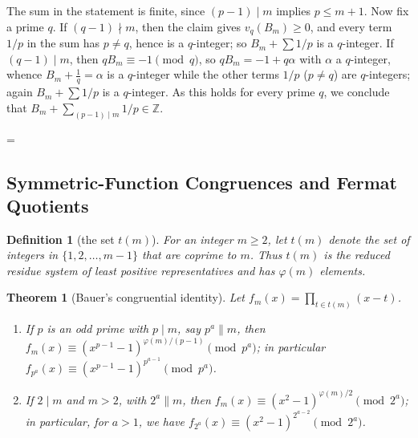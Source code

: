 \documentclass[11pt]{article}
\makeatletter
\theoremstyle{ntstyle}
\newtheorem{theorem}{Theorem}[subsection]
\newtheorem{definition}{Definition}[subsection]
\let\nt@closedisplay\]
\def\nt@guardedclose{\@ifnextchar\par{\nt@closeafterpar}{\@ifnextchar\end{\postdisplaypenalty\@M\nt@closedisplay}{\nt@closedisplay}}}
\def\nt@closeafterpar\par{\@ifnextchar\par{\nt@closeafterpar}{\@ifnextchar\end{\postdisplaypenalty\@M\nt@closedisplay\par}{\nt@closedisplay\par}}}
\renewenvironment{proof}[1][\proofname]{\par
  \pushQED{\qed}\normalfont\topsep\medskipamount\edef\nt@afterproof{\@endparpenalty=\the\@endparpenalty\relax}\@beginparpenalty\@M\@endparpenalty\@M\let\]\nt@guardedclose\trivlist\item[]\textit{#1\@addpunct{.}} \ignorespaces}{\ifvmode\addpenalty\@M\fi\popQED\nt@afterproof\endtrivlist\@endpefalse}
\makeatother
\begin{document}
\begin{proof}
	The sum in the statement is finite, since $(p-1)\mid m$ implies $p\le m+1$.
	  Now fix a prime $q$.
	  If $(q-1) \nmid m$, then the claim gives $v_q(B_m) \ge 0$, and every term $1/p$ in the sum has $p \neq q$, hence is a $q$-integer; so $B_m + \sum 1/p$ is a $q$-integer.
	  If $(q-1) \mid m$, then $q B_m \equiv -1 \pmod{q}$, so $q B_m = -1 + q\alpha$ with $\alpha$ a $q$-integer, whence $B_m + \tfrac{1}{q} = \alpha$ is a $q$-integer while the other terms $1/p$ ($p \neq q$) are $q$-integers; again $B_m + \sum 1/p$ is a $q$-integer.
	  As this holds for every prime $q$, we conclude that $B_m + \sum_{(p-1) \mid m} 1/p \in \mathbb{Z}$.

\end{proof}
\subsection{Symmetric-Function Congruences and Fermat Quotients}

\begin{definition}[the set $t(m)$]\label{def:6.9.1}
	For an integer $m\ge2$, let $t(m)$ denote the set of integers in
	$\{1,2,\ldots,m-1\}$ that are coprime to $m$. Thus $t(m)$ is the
	reduced residue system of least positive representatives and has
	$\varphi(m)$ elements.

\end{definition}
\begin{theorem}[Bauer's congruential identity]\label{thm:6.9.1} Let
	$f_m(x) = \prod_{t \in t(m)}(x - t)$.

	\begin{enumerate}[label={\alph*)}]
		\item If $p$ is an odd prime with $p\mid m$, say $p^{a} \parallel m$, then $f_m(x)
			      \equiv (x^{p-1} - 1)^{\varphi(m)/(p-1)} \pmod{p^{a}}$; in particular
		      $f_{p^{a}}(x) \equiv (x^{p-1} - 1)^{p^{a-1}} \pmod{p^{a}}$.
		\item If $2 \mid m$ and $m > 2$, with $2^{a} \parallel m$, then $f_m(x)
			      \equiv (x^{2} - 1)^{\varphi(m)/2} \pmod{2^{a}}$; in particular, for
		      $a > 1$, we have $f_{2^{a}}(x) \equiv (x^{2} - 1)^{2^{a-2}} \pmod{2^{a}}$.
	\end{enumerate}

\end{theorem}
\end{document}
